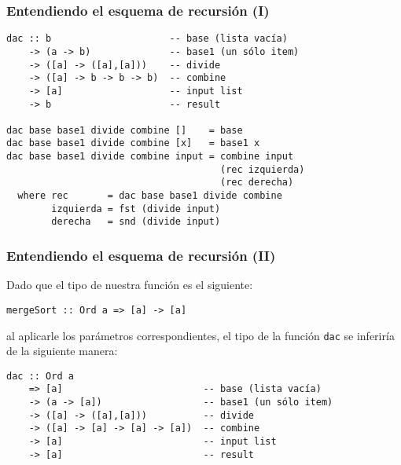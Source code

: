 \documentclass[spanish]{beamer}
\begin{document}
\begin{frame}[fragile]
  \frametitle{Entendiendo el esquema de recursión (I)}

  \begin{Verbatim}
dac :: b                     -- base (lista vacía)
    -> (a -> b)              -- base1 (un sólo item)
    -> ([a] -> ([a],[a]))    -- divide
    -> ([a] -> b -> b -> b)  -- combine
    -> [a]                   -- input list
    -> b                     -- result

dac base base1 divide combine []    = base
dac base base1 divide combine [x]   = base1 x
dac base base1 divide combine input = combine input
                                      (rec izquierda)
                                      (rec derecha)
  where rec       = dac base base1 divide combine
        izquierda = fst (divide input)
        derecha   = snd (divide input)
  \end{Verbatim}
\end{frame}

\begin{frame}[fragile]
  \frametitle{Entendiendo el esquema de recursión (II)}

  Dado que el tipo de nuestra función es el siguiente:

  \vspace{1em}

  \texttt{mergeSort :: Ord a => [a] -> [a]}

  \vspace{1em}

  al aplicarle los parámetros correspondientes, el tipo de la función
  \texttt{dac} se inferiría de la siguiente manera:

  \begin{Verbatim}
dac :: Ord a
    => [a]                         -- base (lista vacía)
    -> (a -> [a])                  -- base1 (un sólo item)
    -> ([a] -> ([a],[a]))          -- divide
    -> ([a] -> [a] -> [a] -> [a])  -- combine
    -> [a]                         -- input list
    -> [a]                         -- result
  \end{Verbatim}
\end{frame}
\end{document}
